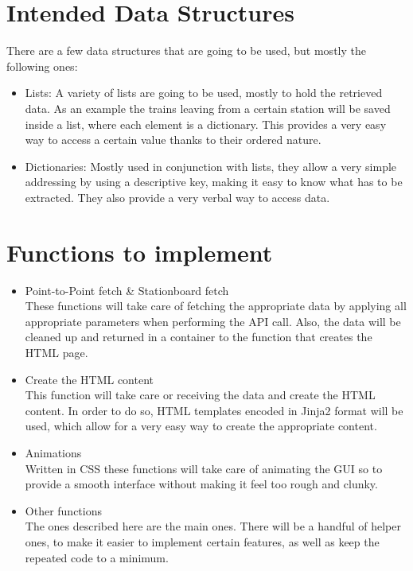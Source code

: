 \documentclass[a4paper]{article}
\begin{document}
\section{Intended Data Structures}
There are a few data structures that are going to be used, but mostly the following ones:
\begin{itemize}
\item Lists: A variety of lists are going to be used, mostly to hold the retrieved data. As an example the trains leaving from a certain station will be saved inside a list, where each element is a dictionary. This provides a very easy way to access a certain value thanks to their ordered nature. 

\item Dictionaries: Mostly used in conjunction with lists, they allow a very simple addressing by using a descriptive key, making it easy to know what has to be extracted. They also provide a very verbal way to access data.
\end{itemize}
\section{Functions to implement}
\begin{itemize}
\item Point-to-Point fetch \& Stationboard fetch\\
These functions will take care of fetching the appropriate data by applying all appropriate parameters when performing the API call. Also, the data will be cleaned up and returned in a container to the function that creates the HTML page. 

\item Create the HTML content\\
This function will take care or receiving the data and create the HTML content. In order to do so, HTML templates encoded in Jinja2 format will be used, which allow for a very easy way to create the appropriate content. 
\item Animations\\
Written in CSS these functions will take care of animating the GUI so to provide a smooth interface without making it feel too rough and clunky. 

\item Other functions\\
The ones described here are the main ones. There will be a handful of helper ones, to make it easier to implement certain features, as well as keep the repeated code to a minimum.
\end{itemize}
\end{document}
